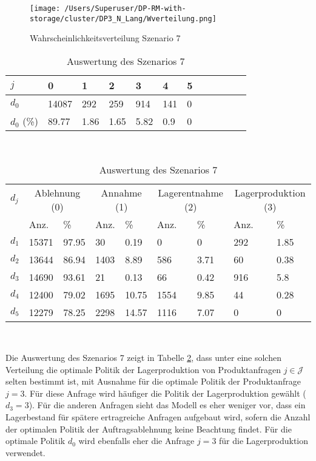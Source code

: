\begin{figure}[h!]
  \begin{center}
    \texttt{[image: /Users/Superuser/DP-RM-with-storage/cluster/DP3\_N\_Lang/Wverteilung.png]}
    \caption{Wahrscheinlichkeitsverteilung Szenario 7}  \label{SB7}
  \end{center}
\end{figure}

\begin{table}[h!]
\renewcommand{\arraystretch}{1.5}
  \begin{center}
    \caption{Auswertung des Szenarios 7}  \label{AS7}
    \vspace*{3mm}
    \begin{tabular}{l l l l l l l l l l l l }  \hline 
         $j$ & 0 & 1  & 2 & 3 & 4  & 5   \\  \hline
$d_{0}$ &  14087 &   292 &   259 &   914 &  141 &  0 \\
$d_{0}$ (\%) &  89.77 &  1.86 &  1.65 &  5.82 &  0.9 &  0 \\
\hline
    \end{tabular} \\[3mm]
        \begin{tabular}{ l l l l l l l l l}   \hline    %
    $d_j$ & \multicolumn{2}{c}{Ablehnung (0)} & \multicolumn{2}{c}{Annahme (1)}  & \multicolumn{2}{c}{Lagerentnahme (2)} & \multicolumn{2}{c}{Lagerproduktion (3)}\\
    & Anz. & \% & Anz. & \% & Anz. & \% & Anz. & \% \\ \hline 
$d_{1}$ &  15371 &  97.95 &    30 &   0.19 &   0 &   0 &  292 &  1.85 \\
$d_{2}$ &  13644 &  86.94 &  1403 &   8.89 &   586 &  3.71 &   60 &  0.38 \\
$d_{3}$ &  14690 &  93.61 &    21 &   0.13 &    66 &  0.42 &  916 &   5.8 \\
$d_{4}$ &  12400 &  79.02 &  1695 &  10.75 &  1554 &  9.85 &   44 &  0.28 \\
$d_{5}$ &  12279 &  78.25 &  2298 &  14.57 &  1116 &  7.07 &  0 &   0 \\
          \hline
   \end{tabular} \\[3mm]
     \end{center}
\end{table}

Die Auswertung des Szenarios 7 zeigt in Tabelle \ref{AS7}, dass unter eine solchen Verteilung die optimale Politik der Lagerproduktion von Produktanfragen $j\in\mathcal{J}$ selten bestimmt ist, mit Ausnahme für die optimale Politik der Produktanfrage $j=3$. Für diese Anfrage wird häufiger die Politik der Lagerproduktion gewählt ($d_3=3$). Für die anderen Anfragen sieht das Modell es eher weniger vor, dass ein Lagerbestand für spätere ertragreiche Anfragen aufgebaut wird, sofern die Anzahl der optimalen Politik der Auftragsablehnung keine Beachtung findet. Für die optimale Politik $d_0$ wird ebenfalls eher die Anfrage $j=3$ für die Lagerproduktion verwendet.

